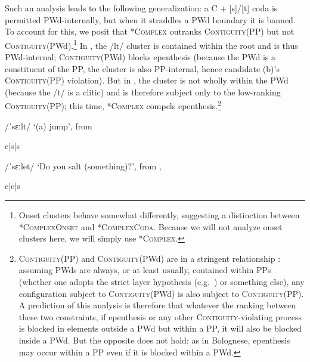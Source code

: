 \documentclass[output=paper,colorlinks,citecolor=brown]{langscibook}
\begin{document}
Such an analysis leads to the following generalization: a C + [s]/[t] coda is permitted PWd-internally, but when it straddles a PWd boundary it is banned.  To account for this, we posit that \textsc{*Complex} outranks \textsc{Contiguity}(PP) but not \textsc{Contiguity}(PWd).\footnote{Onset clusters behave somewhat differently, suggesting a distinction between \textsc{*ComplexOnset} and \textsc{*ComplexCoda}.  Because we will not analyze onset clusters here, we will simply use \textsc{*Complex}.}  In , the /lt/ cluster is contained within the root and is thus PWd-internal; \textsc{Contiguity}(PWd) blocks epenthesis  (because the PWd is a constituent of the PP, the cluster is also PP-internal, hence candidate (b)'s \textsc{Contiguity}(PP) violation).  But in , the cluster is not wholly within the PWd (because the /t/ is a clitic) and is therefore subject only to the low-ranking \textsc{Contiguity}(PP); this time, \textsc{*Complex} compels epenthesis.\footnote{\textsc{Contiguity}(PP) and \textsc{Contiguity}(PWd) are in a stringent relationship \citep{delacy:conflation}: assuming PWds are always, or at least usually, contained within PPs (whether one adopts the strict layer hypothesis (e.g.\ \citealt{selkirk:1984}) or something else), any configuration subject to \textsc{Contiguity}(PWd) is also subject to \textsc{Contiguity}(PP).  A prediction of this analysis is therefore that whatever the ranking between these two constraints, if epenthesis or any other \textsc{Contiguity}-violating process is blocked in elements outside a PWd but within a PP, it will also be blocked inside a PWd.  But the opposite does not hold: as in Bolognese, epenthesis may occur within a PP even if it is blocked within a PWd.}

\begin{table}
\caption{/ˈsɛːlt/ `(a) jump', from }
\label{youjump}
\begin{center}
\ShadingOn
\begin{tableau}{c|s|s} 
         
   \vio{}     \vio{*}  \vio{}
             \vio{*!}   \vio{}  \vio{*}
\end{tableau}
\end{center}
\end{table}

\begin{table}
\caption{/ˈsɛːlet/ ‘Do you salt (something)?’, from , }
\label{doyousalt}
\begin{center}
\ShadingOn
\begin{tableau}{c|c|s} 
         
                       \vio{}     \vio{*!}  \vio{}
             \vio{}   \vio{}  \vio{*}
\end{tableau}
\end{center}
\end{table}
\end{document}
